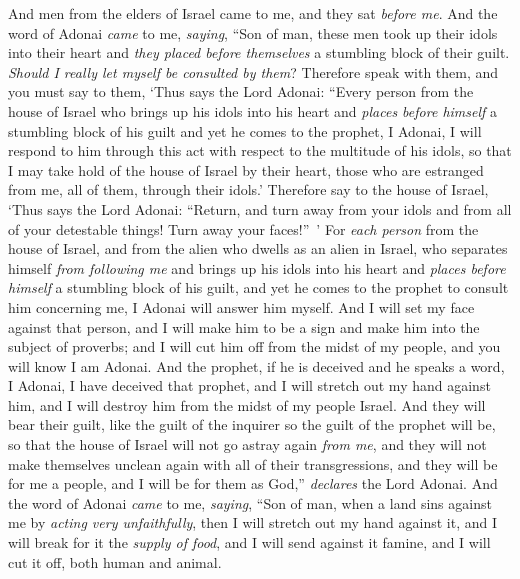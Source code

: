 \begin{biblechapter} %
 And men from the elders of Israel came to me, and they sat \textit{before me}.
\verse And the word of Adonai \textit{came} to me, \textit{saying},
\verse “Son of man, these men took up their idols into their heart and \textit{they placed before themselves} a stumbling block of their guilt. \textit{Should I really let myself be consulted by them}?
\verse Therefore speak with them, and you must say to them, ‘Thus says the Lord Adonai: “Every person from the house of Israel who brings up his idols into his heart and \textit{places before himself} a stumbling block of his guilt and yet he comes to the prophet, I Adonai, I will respond to him through this act with respect to the multitude of his idols,
\verse so that I may take hold of the house of Israel by their heart, those who are estranged from me, all of them, through their idols.’
\verse Therefore say to the house of Israel, ‘Thus says the Lord Adonai: “Return, and turn away from your idols and from all of your detestable things! Turn away your faces!” ’
\verse For \textit{each person} from the house of Israel, and from the alien who dwells as an alien in Israel, who separates himself \textit{from following me} and brings up his idols into his heart and \textit{places before himself} a stumbling block of his guilt, and yet he comes to the prophet to consult him concerning me, I Adonai will answer him myself.
\verse And I will set my face against that person, and I will make him to be a sign and make him into the subject of proverbs; and I will cut him off from the midst of my people, and you will know I am Adonai.
\verse And the prophet, if he is deceived and he speaks a word, I Adonai, I have deceived that prophet, and I will stretch out my hand against him, and I will destroy him from the midst of my people Israel.
\verse And they will bear their guilt, like the guilt of the inquirer so the guilt of the prophet will be,
\verse so that the house of Israel will not go astray again \textit{from me}, and they will not make themselves unclean again with all of their transgressions, and they will be for me a people, and I will be for them as God,” \textit{declares} the Lord Adonai.
 And the word of Adonai \textit{came} to me, \textit{saying},
\verse “Son of man, when a land sins against me by \textit{acting very unfaithfully}, then I will stretch out my hand against it, and I will break for it the \textit{supply of food}, and I will send against it famine, and I will cut it off, both human and animal.

\end{biblechapter}
